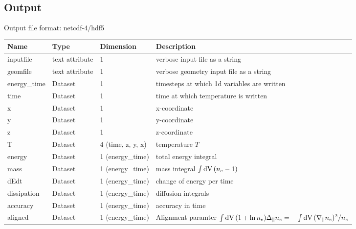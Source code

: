 \subsection{Output}
Output file format: netcdf-4/hdf5
%
\begin{longtable}{lll>{\RaggedRight}p{7cm}}
\toprule
\rowcolor{gray!50}\textbf{Name} &  \textbf{Type} & \textbf{Dimension} & \textbf{Description}  \\ \midrule
inputfile  &     text attribute & 1 & verbose input file as a string \\
geomfile   &     text attribute & 1 & verbose geometry input file as a string \\
energy\_time     & Dataset & 1 & timesteps at which 1d variables are written \\
time             & Dataset & 1 & time at which temperature is written \\
x                & Dataset & 1 & x-coordinate  \\
y                & Dataset & 1 & y-coordinate \\
z                & Dataset & 1 & z-coordinate \\
T                & Dataset & 4 (time, z, y, x) & temperature $T$ \\
energy           & Dataset & 1 (energy\_time) & total energy integral  \\
mass             & Dataset & 1 (energy\_time) & mass integral $\int\mathrm{dV}\, (n_e-1)$   \\
dEdt             & Dataset & 1 (energy\_time) & change of energy per time  \\
dissipation      & Dataset & 1 (energy\_time) & diffusion integrals  \\
accuracy         & Dataset & 1 (energy\_time) & accuracy in time  \\
aligned          & Dataset & 1 (energy\_time) & Alignment paramter $\int\mathrm{dV}\, (1+\ln n_e)\Delta_\parallel n_e =  -\int\mathrm{dV}\, (\nabla_\parallel n_e)^2 /n_e$\\
\bottomrule
\end{longtable}






